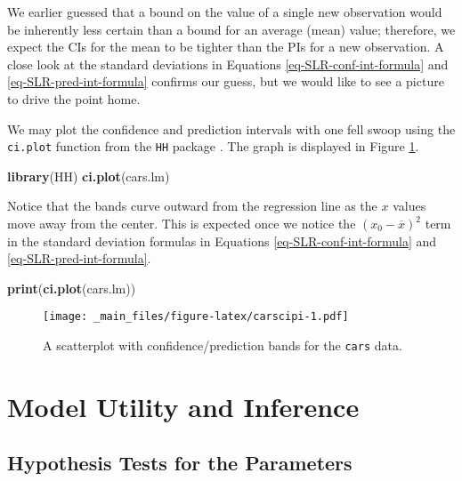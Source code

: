 \documentclass[]{book}
\newenvironment{Shaded}{\begin{snugshade}}{\end{snugshade}}
\newcommand{\KeywordTok}[1]{\textcolor[rgb]{0.13,0.29,0.53}{\textbf{{#1}}}}
\newcommand{\NormalTok}[1]{{#1}}
\numberwithin{equation}{chapter}
\numberwithin{figure}{chapter}
\theoremstyle{plain}
\theoremstyle{definition}
\theoremstyle{remark}
\theoremstyle{definition}
\theoremstyle{definition}
\theoremstyle{remark}
\begin{document}
We earlier guessed that a bound on the value of a single new observation
would be inherently less certain than a bound for an average (mean)
value; therefore, we expect the CIs for the mean to be tighter than the
PIs for a new observation. A close look at the standard deviations in
Equations \eqref{eq-SLR-conf-int-formula} and
\eqref{eq-SLR-pred-int-formula} confirms our guess, but we would like to
see a picture to drive the point home.

We may plot the confidence and prediction intervals with one fell swoop
using the \texttt{ci.plot} function from the \texttt{HH} package
\autocite{HH}. The graph is displayed in Figure \ref{fig:carscipi}.

\begin{Shaded}
\begin{Highlighting}[]
\KeywordTok{library}\NormalTok{(HH)}
\KeywordTok{ci.plot}\NormalTok{(cars.lm)}
\end{Highlighting}
\end{Shaded}

Notice that the bands curve outward from the regression line as the
\(x\) values move away from the center. This is expected once we notice
the \((x_{0}-\overline{x})^{2}\) term in the standard deviation formulas
in Equations \eqref{eq-SLR-conf-int-formula} and
\eqref{eq-SLR-pred-int-formula}.

\begin{Shaded}
\begin{Highlighting}[]
\KeywordTok{print}\NormalTok{(}\KeywordTok{ci.plot}\NormalTok{(cars.lm))}
\end{Highlighting}
\end{Shaded}

\begin{figure}[htbp]
\centering
\texttt{[image: \_main\_files/figure-latex/carscipi-1.pdf]}
\caption{\label{fig:carscipi}\small A scatterplot with confidence/prediction bands
for the \texttt{cars} data.}
\end{figure}




\section{Model Utility and Inference}\label{sec-model-utility-slr}

\subsection{Hypothesis Tests for the
Parameters}\label{sub-slr-hypoth-test-params}
\end{document}
